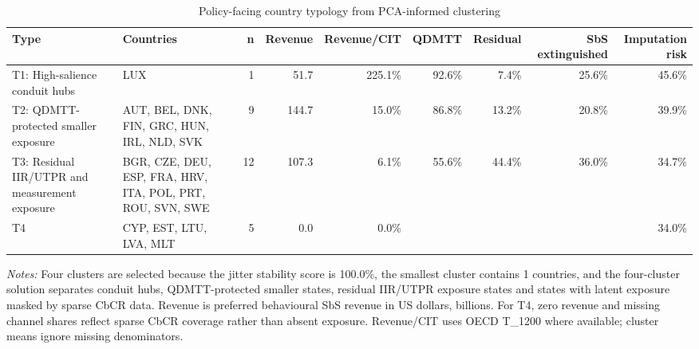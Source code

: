 \begin{table}[H]
\centering
\scriptsize
\caption[Policy-facing country typology]{Policy-facing country typology from PCA-informed clustering}
\label{tab:country_typology_clusters}
\begin{adjustbox}{max width=\textwidth,center}
\begin{tabular}{@{}L{3.2cm}L{4.8cm}rrrrrrr@{}}
\toprule
Type & Countries & n & Revenue & Revenue/CIT & QDMTT & Residual & SbS extinguished & Imputation risk \\
\midrule
T1: High-salience conduit hubs & LUX &  1 &  51.7 & 225.1\% & 92.6\% &  7.4\% & 25.6\% & 45.6\% \\
T2: QDMTT-protected smaller exposure & AUT, BEL, DNK, FIN, GRC, HUN, IRL, NLD, SVK &  9 & 144.7 &  15.0\% & 86.8\% & 13.2\% & 20.8\% & 39.9\% \\
T3: Residual IIR/UTPR and measurement exposure & BGR, CZE, DEU, ESP, FRA, HRV, ITA, POL, PRT, ROU, SVN, SWE & 12 & 107.3 &   6.1\% & 55.6\% & 44.4\% & 36.0\% & 34.7\% \\
T4 & CYP, EST, LTU, LVA, MLT &  5 &   0.0 &   0.0\% &  &  &  & 34.0\% \\
\bottomrule
\end{tabular}
\end{adjustbox}

\vspace{0.5em}
\begin{minipage}{0.96\textwidth}
\footnotesize\raggedright \textit{Notes:} Four clusters are selected because the jitter stability score is 100.0\%, the smallest cluster contains 1 countries, and the four-cluster solution separates conduit hubs, QDMTT-protected smaller states, residual IIR/UTPR exposure states and states with latent exposure masked by sparse CbCR data. Revenue is preferred behavioural SbS revenue in US dollars, billions. For T4, zero revenue and missing channel shares reflect sparse CbCR coverage rather than absent exposure. Revenue/CIT uses OECD T\_1200 where available; cluster means ignore missing denominators.
\end{minipage}
\end{table}
